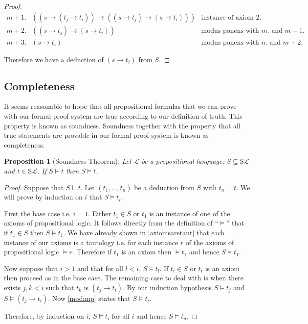 \documentclass[11pt]{article}
\newcommand{\PF}{\mathrm{S}}
\newtheorem{proposition}[theorem]{Proposition}
\newcommand{\mcal}[1]{\mathcal{#1}}
\begin{document}
\begin{proof}
\medskip

$
\begin{array}{rcl}
  m+1. & ((s\rightarrow (t_j\rightarrow t_i))\rightarrow ((s\rightarrow t_j)\rightarrow (s\rightarrow t_i))) & \text{instance of axiom 2.} \\
  m+2. & ((s\rightarrow t_j)\rightarrow (s\rightarrow t_i)) & \text{modus ponens with $m.$ and $m+1.$} \\
  m+3. & (s\rightarrow t_i) & \text{modus ponens with $n.$ and $m+2.$}
\end{array}
$

\medskip

Therefore we have a deduction of $(s\rightarrow t_i)$ from $S$.
\end{proof}


\subsection{Completeness}
It seems reasonable to hope that all propositional formulas that we can prove with our formal proof system are true according to our definition of truth. This property is known as soundness. Soundness together with the property that all true statements are provable in our formal proof system is known as completeness.

\begin{proposition}[Soundness Theorem]\label{Soundnessprop}
Let $\mcal{L}$ be a propositional language, $S\subseteq \PF\mcal{L}$ and $t\in\PF\mcal{L}$. If $S\vdash t$ then $S\models t$.
\end{proposition}
\begin{proof}
Suppose that $S\vdash t$. Let $(t_1,\ldots, t_n)$ be a deduction from $S$ with $t_n=t$. We will prove by induction on $i$ that $S\models t_i$.

First the base case i.e. $i=1$.
Either $t_1\in S$ or $t_1$ is an instance of one of the axioms of propositional logic. It follows directly from the definition of ``$\models$'' that if $t_1\in S$ then $S\models t_1$. We have already shown in \ref{axiomsaretaut} that each instance of our axioms is a tautology i.e. for each instance $r$ of the axioms of propositional logic $\models r$. Therefore if $t_1$ is an axiom then $\models t_1$ and hence $S\models t_1$.

Now suppose that $i>1$ and that for all $l<i$, $S\models t_l$.
If $t_i\in S$ or $t_i$ is an axiom then proceed as in the base case. The remaining case to deal with is when there exists $j,k<i$ such that $t_k$ is $(t_j\rightarrow t_i)$. By our induction hypothesis $S\models t_j$ and $S\models (t_j\rightarrow t_i)$. Now \ref{modimp} states that $S\models t_i$.

Therefore, by induction on $i$, $S\models t_i$ for all $i$ and hence $S\models t_n$.
\end{proof}
\end{document}
